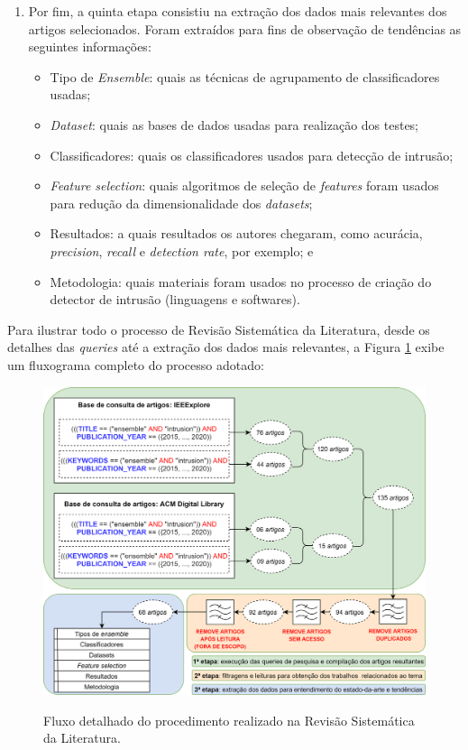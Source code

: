 \begin{enumerate}
    \item Por fim, a quinta etapa consistiu na extração dos dados mais relevantes dos artigos selecionados. Foram extraídos para fins de observação de tendências as seguintes informações:
     \begin{itemize}
         \item Tipo de \textit{Ensemble}: quais as técnicas de agrupamento de classificadores usadas;
         \item \textit{Dataset}: quais as bases de dados usadas para realização dos testes;
         \item Classificadores: quais os classificadores usados para detecção de intrusão;
         \item \textit{Feature selection}: quais algoritmos de seleção de \textit{features} foram usados para redução da dimensionalidade dos \textit{datasets}; 
         \item Resultados: a quais resultados os autores chegaram, como acurácia, \textit{precision}, \textit{recall} e \textit{detection rate}, por exemplo; e
         \item Metodologia: quais materiais foram usados no processo de criação do detector de intrusão (linguagens e softwares).
     \end{itemize}

\end{enumerate}

Para ilustrar todo o processo de Revisão Sistemática da Literatura, desde os detalhes das \textit{queries} até a extração dos dados mais relevantes, a Figura \ref{fig:diagrama_detalhado_rev_sistematica} exibe um fluxograma completo do processo adotado:

\begin{figure}[H]
\centering
\caption{Fluxo detalhado do procedimento realizado na Revisão Sistemática da Literatura. } \includegraphics[width=\textwidth,keepaspectratio]{figs/diagrama_detalhado_rev_sistematica.png}
\newline {}\label{fig:diagrama_detalhado_rev_sistematica}
\end{figure}    
    
